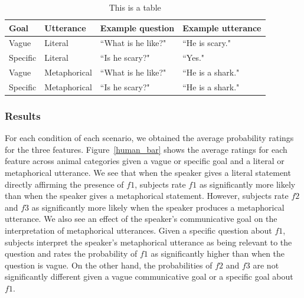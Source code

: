 \documentclass[10pt,letterpaper]{article}
\begin{document}
\begin{table}
\tabcolsep=0.2cm
\small
\caption{This is a table}
\begin{tabular}{llll}
\toprule
Goal & Utterance & Example question & Example utterance \\
\midrule
Vague & Literal & ``What is he like?" & ``He is scary." \\
Specific  & Literal & ``Is he scary?" & ``Yes." \\
Vague & Metaphorical & ``What is he like?" & ``He is a shark." \\
Specific & Metaphorical & ``Is he scary?" & ``He is a shark." \\
\bottomrule
\end{tabular}
\end{table}

\subsubsection{Results}

For each condition of each scenario, we obtained the average probability ratings for the three features. Figure~\ref{human_bar} shows the average ratings for each feature across animal categories given a vague or specific goal and a literal or metaphorical utterance. We see that when the speaker gives a literal statement directly affirming the presence of $f1$, subjects rate $f1$ as significantly more likely than when the speaker gives a metaphorical statement. However, subjects rate $f2$ and $f3$ as significantly more likely when the speaker produces a metaphorical utterance. We also see an effect of the speaker's communicative goal on the interpretation of metaphorical utterances. Given a specific question about $f1$, subjects interpret the speaker's metaphorical utterance as being relevant to the question and rates the probability of $f1$ as significantly higher than when the question is vague. On the other hand, the probabilities of $f2$ and $f3$ are not significantly different given a vague communicative goal or a specific goal about $f1$.
\end{document}
